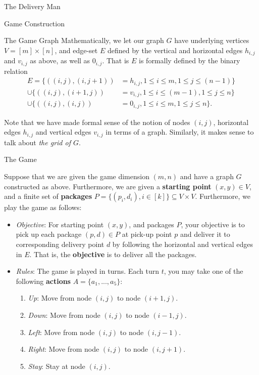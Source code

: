 \begin{section}{The Delivery Man}
\begin{subsection}{Game Construction}
\begin{subsubsection}{The Game Graph}
    Mathematically, we let our graph $G$ have underlying vertices $V = [m] \times [n]$, and edge-set $E$ defined by the vertical and horizontal edges $h_{i,j}$ and $v_{i,j}$ as above, as well as $0_{i,j}$. That is $E$ is formally defined by the binary relation
    \begin{equation}
      \begin{split}
      E = \{((i, j), (i, j+1)) &= h_{i,j}, 1 \leq i \leq m, 1 \leq j \leq (n-1)\}
      \\ \cup \{((i, j), (i+1, j)) &= v_{i,j}, 1 \leq i \leq (m-1), 1 \leq j \leq n \}
      \\ \cup \{((i, j), (i, j)) &= 0_{i,j}, 1 \leq i \leq m, 1 \leq j \leq n \}.
      \end{split}
    \end{equation}

    Note that we have made formal sense of the notion of nodes $(i, j)$, horizontal edges $h_{i,j}$ and vertical edges $v_{i,j}$ in terms of a graph. Similarly, it makes sense to talk about \textit{the grid of $G$}.

    \end{subsubsection}
    
    \begin{subsubsection}{The Game}

       Suppose that we are given the game dimension $(m, n)$ and have a graph $G$ constructed as above. Furthermore, we are given a \textbf{starting point} $(x, y)\in V$, and a finite set of \textbf{packages} $P = \{(p_i, d_i), i \in [k]\} \subseteq V\times V$. Furthermore, we play the game as follows:
      \begin{itemize}

        \item \textit{Objective}: For starting point $(x,y)$, and packages $P$, your objective is to pick up each package $(p,d)\in P$ at pick-up point $p$ and deliver it to corresponding delivery point $d$ by following the horizontal and vertical edges in $E$. That is, the \textbf{objective} is to deliver all the packages.

        \item \textit{Rules}:
          The game is played in turns. Each turn $t$, you may take one of the following \textbf{actions} $A = \{a_1, ..., a_5 \}$:
          \begin{enumerate}
          \item \textit{Up}: Move from node $(i, j)$ to node $(i+1, j)$.
          \item \textit{Down}: Move from node $(i, j)$ to node $(i-1, j)$.
          \item \textit{Left}: Move from node $(i, j)$ to node $(i, j-1)$.
          \item \textit{Right}: Move from node $(i, j)$ to node $(i, j+1)$.
          \item \textit{Stay}: Stay at node $(i, j)$.
          \end{enumerate}
          

\end{itemize}
\end{subsubsection}
\end{subsection}
\end{section}
